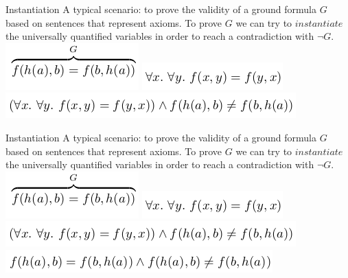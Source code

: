 \documentclass{beamer}
\begin{document}
\begin{frame}{Instantiation}
A typical scenario: to prove the validity of a ground formula $G$ based on sentences that represent axioms.\newline
To prove $G$ we can try to $instantiate$ the universally quantified variables in order to reach a contradiction with $\lnot G$.
\includegraphics[scale=0.5]{ground.png}\newline
\includegraphics[scale=0.5]{axiom.png}\newline
\includegraphics[scale=0.5]{toproof.png}\newline
\end{frame}

\begin{frame}{Instantiation}
A typical scenario: to prove the validity of a ground formula $G$ based on sentences that represent axioms.\newline
To prove $G$ we can try to $instantiate$ the universally quantified variables in order to reach a contradiction with $\lnot G$.
\includegraphics[scale=0.5]{ground.png}\newline
\includegraphics[scale=0.5]{axiom.png}\newline
\includegraphics[scale=0.5]{toproof.png}\newline
\includegraphics[scale=0.5]{instantiation.png}\newline
\end{frame}
\end{document}
